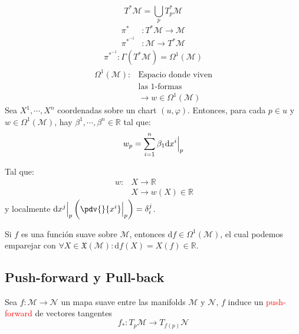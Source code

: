 \documentclass[../main]{subfiles}
\begin{document}
\begin{adjustwidth}{0pt}{-100pt}
\begin{minipage}[t]{0.5\textwidth}
\begin{adjustwidth}{20pt}{0pt}
    \begin{equation*}
        T^{*}\mathcal{M}=\bigcup_p T^{*}_p \mathcal{M}
    \end{equation*}
    \vspace{-0.7cm}
    \begin{align*}
        \pi^{*}&: T^{*}\mathcal{M} \rightarrow \mathcal{M} \\
        \pi^{*^{-1}}&: \mathcal{M} \rightarrow T^{*}\mathcal{M}
    \end{align*}
    \vspace{-0.9cm}
    \begin{align*}
        \pi^{*^{-1}}: \Gamma(T^{*}\mathcal{M})=\Omega^1(\mathcal{M})
    \end{align*}
    \vspace{-0.9cm}
    \begin{align*}
         \Omega^1(\mathcal{M}): &\text{Espacio donde viven}\\
         &\text{las 1-formas}\\
         &\rightarrow w \in \Omega^1(\mathcal{M})
    \end{align*}
    Sea $X^1, \cdots, X^n$ coordenadas sobre un chart $(u, \varphi)$. Entonces, para cada $p \in u$ y $w \in \Omega^1(\mathcal{M})$, hay $\beta^1, \cdots, \beta^n \in \mathbb{R}$ tal que:
    \begin{equation*}
        w_p=\sum_{i=1}^n \beta_1 \mathrm{d}x^{i}\Big{|}_p
    \end{equation*}
\end{adjustwidth}
\end{minipage}

Tal que:
\begin{align*}
    \ w: &X \rightarrow \mathbb{R} \\
    &X \rightarrow w(X) \in \mathbb{R}
\end{align*}
y localmente $\mathrm{d}x^{j}\Big{|}_p \left(\pdv{}{x^{i}}\Big{|}_p\right)=\delta^j_i$.

\ejemplo{} Si $f$ es una función suave sobre $\mathcal{M}$, entonces $\mathrm{d}f \in \Omega^1(\mathcal{M})$, el cual podemos emparejar con $\forall X \in \mathfrak{X}(\mathcal{M}): \mathrm{d}f(X)=X(f) \in \mathbb{R}$.

\subsection{Push-forward y Pull-back}
Sea $f: \mathcal{M}\rightarrow \mathcal{N}$ un mapa suave entre las manifolds $\mathcal{M}$ y $\mathcal{N}$, $f$ induce un \textcolor{red}{push-forward} de vectores tangentes
\begin{equation}
    f_{*}: T_p \mathcal{M} \rightarrow T_{f(p)}\mathcal{N}
\end{equation}


\end{adjustwidth}
\end{document}
